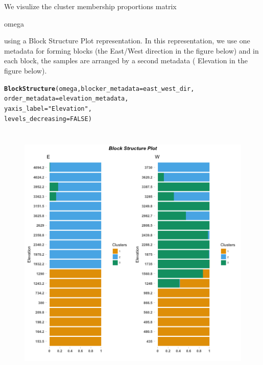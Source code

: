 \documentclass[12pt]{article}\usepackage[]{graphicx}\usepackage[usenames,dvipsnames]{color}
\makeatletter
\newcommand{\hlnum}[1]{\textcolor[rgb]{0.686,0.059,0.569}{#1}}%
\newcommand{\hlstr}[1]{\textcolor[rgb]{0.192,0.494,0.8}{#1}}%
\newcommand{\hlstd}[1]{\textcolor[rgb]{0.345,0.345,0.345}{#1}}%
\newcommand{\hlkwc}[1]{\textcolor[rgb]{0.333,0.667,0.333}{#1}}%
\newcommand{\hlkwd}[1]{\textcolor[rgb]{0.737,0.353,0.396}{\textbf{#1}}}%
\newenvironment{kframe}{%
 \def\at@end@of@kframe{}%
 \ifinner\ifhmode%
  \def\at@end@of@kframe{\end{minipage}}%
  \begin{minipage}{\columnwidth}%
 \fi\fi%
 \def\FrameCommand##1{\hskip\@totalleftmargin \hskip-\fboxsep
 \colorbox{shadecolor}{##1}\hskip-\fboxsep
     \hskip-\linewidth \hskip-\@totalleftmargin \hskip\columnwidth}%
 \MakeFramed {\advance\hsize-\width
   \@totalleftmargin\z@ \linewidth\hsize
   \@setminipage}}%
 {\par\unskip\endMakeFramed%
 \at@end@of@kframe}
\newenvironment{knitrout}{}{} %
\makeatother
\begin{document}
We visulize the cluster membership proportions matrix \begin{verb} omega \end{verb} using a Block Structure Plot representation. In this representation, we use one metadata for forming blocks (the East/West direction in the figure below) and in each block, the samples are arranged by a second metadata ( Elevation in the figure below).

\begin{knitrout}
\color{fgcolor}\begin{kframe}
\begin{alltt}
\hlkwd{BlockStructure}\hlstd{(omega,} \hlkwc{blocker_metadata} \hlstd{= east_west_dir,}
               \hlkwc{order_metadata} \hlstd{= elevation_metadata,}
               \hlkwc{yaxis_label} \hlstd{=} \hlstr{"Elevation"}\hlstd{,}
               \hlkwc{levels_decreasing} \hlstd{=} \hlnum{FALSE}\hlstd{)}
\end{alltt}
\end{kframe}
\end{knitrout}

\begin{figure}[htp]
\begin{center}
\includegraphics[width=6in,height=5in]{figure/block_structure-2.png}
\end{center}
\end{figure}
\end{document}
